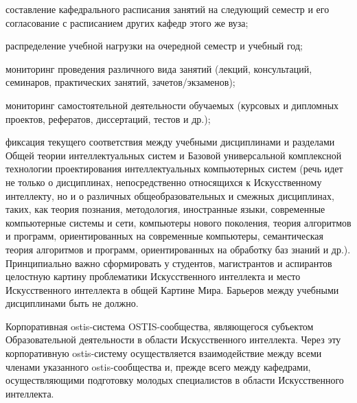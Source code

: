 {\begin{scnitemize}
    \begin{scnitemizeii}
        \item составление кафедрального расписания занятий на следующий семестр и его согласование с расписанием других кафедр этого же вуза;
        \item распределение учебной нагрузки на очередной семестр и учебный год;
        \item мониторинг проведения различного вида занятий (лекций, консультаций, семинаров, практических занятий, зачетов/экзаменов);
        \item мониторинг самостоятельной деятельности обучаемых (курсовых и дипломных проектов, рефератов, диссертаций, тестов и др.);
        \item фиксация текущего соответствия между учебными дисциплинами и разделами Общей теории интеллектуальных систем и Базовой универсальной комплексной технологии проектирования интеллектуальных компьютерных систем (речь идет не только о дисциплинах, непосредственно относящихся к Искусственному интеллекту, но и о различных общеобразовательных и смежных дисциплинах, таких, как теория познания, методология, иностранные языки, современные компьютерные системы и сети, компьютеры нового поколения, теория алгоритмов и программ, ориентированных на современные компьютеры, семантическая теория алгоритмов и программ, ориентированных на обработку баз знаний и др.). Принципиально важно сформировать у студентов, магистрантов и аспирантов целостную картину проблематики Искусственного интеллекта и место Искусственного интеллекта в общей Картине Мира. Барьеров между учебными дисциплинами быть не должно.
    \end{scnitemizeii}
    \item Корпоративная ostis-система OSTIS-сообщества, являющегося субъектом Образовательной деятельности в области Искусственного интеллекта. Через эту корпоративную ostis-систему осуществляется взаимодействие между всеми членами указанного ostis-сообщества и, прежде всего между кафедрами, осуществляющими подготовку молодых специалистов в области Искусственного интеллекта.
\end{scnitemize}}

